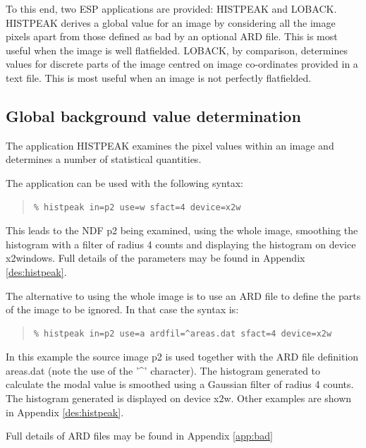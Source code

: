\documentclass[twoside,11pt]{article}
\newcommand{\xlabel}[1]{}
\newenvironment{myquote}{\begin{quote}\begin{small}}{\end{small}\end{quote}}
\begin{document}
To this end, two ESP applications are provided: HISTPEAK and LOBACK.
HISTPEAK derives a global value for an image by considering all the
image pixels apart from those defined as bad by an optional ARD
file. This is most useful when the image is well flatfielded. LOBACK,
by comparison, determines values for discrete parts of the image
centred on image co-ordinates provided in a text file. This is most
useful when an image is not perfectly flatfielded.

\subsection{Global background value determination}
\xlabel{GLOBALBACKGROUNDS}

The application HISTPEAK examines the pixel values within an image
and determines a number of statistical quantities.

The application can be used with the following syntax:

\begin{myquote}
\begin{verbatim}
% histpeak in=p2 use=w sfact=4 device=x2w
\end{verbatim}
\end{myquote}

This leads to the NDF p2 being examined, using the whole image, smoothing 
the histogram with a filter of radius 4 counts and displaying the histogram on
device x2windows. Full details of the parameters may be found in Appendix 
\ref{des:histpeak}.

The alternative to using the whole image is to use an ARD file to define the
parts of the image to be ignored. In that case the syntax is:

\begin{myquote}
\begin{verbatim}
% histpeak in=p2 use=a ardfil=^areas.dat sfact=4 device=x2w
\end{verbatim}
\end{myquote}

In this example the source image p2 is used together with the 
ARD file definition areas.dat (note the use of the '\^{ }' character). 
The histogram generated to 
calculate the modal value is smoothed using a Gaussian filter 
of radius 4 counts. The histogram generated is displayed on 
device x2w. Other examples are shown in Appendix \ref{des:histpeak}.

Full details of ARD files may be found in Appendix \ref{app:bad}
\end{document}
